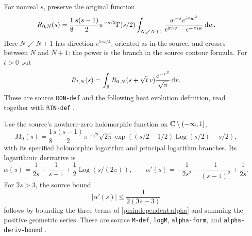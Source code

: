 \documentclass[11pt]{article}
\begin{document}
For nonreal $s$, preserve the original function
\begin{equation}\label{pmindependent:defR}
 R_{0,N}(s)=\frac18\frac{s(s-1)}2\pi^{-s/2}\Gamma(s/2)
 \int_{N\swarrow N+1}
 \frac{w^{-s}e^{i\pi w^2}}{e^{\pi iw}-e^{-\pi iw}}\,\mathrm d w.
\end{equation}
Here $N\swarrow N+1$ has direction $e^{5\pi i/4}$, oriented as
in the source, and crosses between $N$ and $N+1$; the power is
the branch in the source contour formula. For $t>0$ put
\begin{equation}\label{pmindependent:heatR}
 R_{t,N}(s)=\int_\mathbb R R_{0,N}(s+\sqrt t\,v)
                      \frac{e^{-v^2}}{\sqrt\pi}\,\mathrm d v.
\end{equation}
These are source \texttt{RON-def} and the following heat evolution
definition, read together with \texttt{RTN-def} \cite{pmindependent:polymath}.

Use the source's nowhere-zero holomorphic function on
$\mathbb C\setminus(-\infty,1]$,
\begin{equation}\label{pmindependent:defM}
 M_0(s)=\frac18\frac{s(s-1)}2\pi^{-s/2}\sqrt{2\pi}
 \exp\!\left((s/2-1/2)\operatorname{Log}(s/2)-s/2\right),
\end{equation}
with its specified holomorphic logarithm and principal logarithm
branches. Its logarithmic derivative is
\begin{equation}\label{pmindependent:alpha}
 \alpha(s)=\frac1{2s}+\frac1{s-1}+\frac12\operatorname{Log}(s/(2\pi)),
 \qquad
 \alpha'(s)=-\frac1{2s^2}-\frac1{(s-1)^2}+\frac1{2s}.
\end{equation}
For $\Im s>3$, the source bound
\begin{equation}\label{pmindependent:alphabound}
 |\alpha'(s)|\le\frac1{2(\Im s-3)}
\end{equation}
follows by bounding the three terms of \eqref{pmindependent:alpha} and summing
the positive geometric series. These are source \texttt{M-def},
\texttt{logM}, \texttt{alpha-form}, and
\texttt{alpha-deriv-bound} \cite{pmindependent:polymath}.
\end{document}
